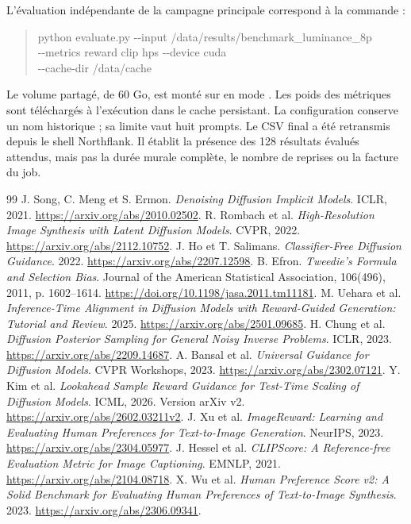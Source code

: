 \documentclass[11pt,a4paper]{article}
\newcommand{\code}[1]{\texttt{\detokenize{#1}}}
\begin{document}
L'évaluation indépendante de la campagne principale correspond à la commande :
\begin{quote}\small\ttfamily
python evaluate.py -{}-input /data/results/benchmark\_luminance\_8p\\
\hspace*{1em}-{}-metrics reward clip hps -{}-device cuda\\
\hspace*{1em}-{}-cache-dir /data/cache
\end{quote}
Le volume partagé, de 60 Go, est monté sur \code{/data} en mode \code{ReadWriteMany}. Les poids des métriques sont téléchargés à l'exécution dans le cache persistant. La configuration \code{benchmark_luminance_10p.json} conserve un nom historique ; sa limite vaut huit prompts. Le CSV final a été retransmis depuis le shell Northflank. Il établit la présence des 128 résultats évalués attendus, mais pas la durée murale complète, le nombre de reprises ou la facture du job.

\clearpage
\begin{thebibliography}{99}
 J. Song, C. Meng et S. Ermon. \emph{Denoising Diffusion Implicit Models}. ICLR, 2021. \url{https://arxiv.org/abs/2010.02502}.
 R. Rombach et al. \emph{High-Resolution Image Synthesis with Latent Diffusion Models}. CVPR, 2022. \url{https://arxiv.org/abs/2112.10752}.
 J. Ho et T. Salimans. \emph{Classifier-Free Diffusion Guidance}. 2022. \url{https://arxiv.org/abs/2207.12598}.
 B. Efron. \emph{Tweedie's Formula and Selection Bias}. Journal of the American Statistical Association, 106(496), 2011, p. 1602--1614. \url{https://doi.org/10.1198/jasa.2011.tm11181}.
 M. Uehara et al. \emph{Inference-Time Alignment in Diffusion Models with Reward-Guided Generation: Tutorial and Review}. 2025. \url{https://arxiv.org/abs/2501.09685}.
 H. Chung et al. \emph{Diffusion Posterior Sampling for General Noisy Inverse Problems}. ICLR, 2023. \url{https://arxiv.org/abs/2209.14687}.
 A. Bansal et al. \emph{Universal Guidance for Diffusion Models}. CVPR Workshops, 2023. \url{https://arxiv.org/abs/2302.07121}.
 Y. Kim et al. \emph{Lookahead Sample Reward Guidance for Test-Time Scaling of Diffusion Models}. ICML, 2026. Version arXiv v2. \url{https://arxiv.org/abs/2602.03211v2}.
 J. Xu et al. \emph{ImageReward: Learning and Evaluating Human Preferences for Text-to-Image Generation}. NeurIPS, 2023. \url{https://arxiv.org/abs/2304.05977}.
 J. Hessel et al. \emph{CLIPScore: A Reference-free Evaluation Metric for Image Captioning}. EMNLP, 2021. \url{https://arxiv.org/abs/2104.08718}.
 X. Wu et al. \emph{Human Preference Score v2: A Solid Benchmark for Evaluating Human Preferences of Text-to-Image Synthesis}. 2023. \url{https://arxiv.org/abs/2306.09341}.
\end{thebibliography}
\end{document}
